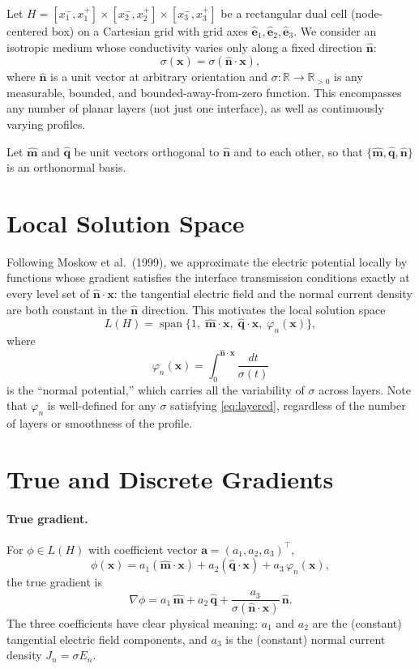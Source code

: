 \documentclass[11pt]{article}
\newcommand{\nn}{\hat{\bm{n}}}
\newcommand{\mm}{\hat{\bm{m}}}
\newcommand{\qq}{\hat{\bm{q}}}
\newcommand{\ee}[1]{\hat{\bm{e}}_{#1}}
\begin{document}
Let $H = [x_1^-,x_1^+]\times[x_2^-,x_2^+]\times[x_3^-,x_3^+]$ be a rectangular
dual cell (node-centered box) on a Cartesian grid with grid axes
$\ee{1},\ee{2},\ee{3}$.  We consider an isotropic medium whose conductivity
varies only along a fixed direction $\nn$:
\begin{equation}\label{eq:layered}
    \sigma(\bm{x}) = \sigma(\nn\cdot\bm{x}),
\end{equation}
where $\nn$ is a unit vector at arbitrary orientation and $\sigma:\mathbb{R}\to\mathbb{R}_{>0}$
is any measurable, bounded, and bounded-away-from-zero function.  This
encompasses any number of planar layers (not just one interface), as well as
continuously varying profiles.

Let $\mm$ and $\qq$ be unit vectors orthogonal to $\nn$ and to each other, so
that $\{\mm,\qq,\nn\}$ is an orthonormal basis.

\section{Local Solution Space}

Following Moskow et al.\ (1999), we approximate the electric potential locally
by functions whose gradient satisfies the interface transmission conditions
exactly at every level set of $\nn\cdot\bm{x}$: the tangential electric field
and the normal current density are both constant in the $\nn$ direction.
This motivates the local solution space
\[
    L(H) = \operatorname{span}\bigl\{1,\;\mm\cdot\bm{x},\;\qq\cdot\bm{x},\;\varphi_n(\bm{x})\bigr\},
\]
where
\[
    \varphi_n(\bm{x}) = \int_0^{\nn\cdot\bm{x}} \frac{dt}{\sigma(t)}
\]
is the ``normal potential,'' which carries all the variability of $\sigma$
across layers.  Note that $\varphi_n$ is well-defined for any $\sigma$
satisfying \eqref{eq:layered}, regardless of the number of layers or
smoothness of the profile.

\section{True and Discrete Gradients}

\paragraph{True gradient.}
For $\phi\in L(H)$ with coefficient vector $\bm{a}=(a_1,a_2,a_3)^\top$,
\[
    \phi(\bm{x}) = a_1(\mm\cdot\bm{x}) + a_2(\qq\cdot\bm{x}) + a_3\,\varphi_n(\bm{x}),
\]
the true gradient is
\begin{equation}\label{eq:true_grad}
    \nabla\phi = a_1\,\mm + a_2\,\qq + \frac{a_3}{\sigma(\nn\cdot\bm{x})}\,\nn.
\end{equation}
The three coefficients have clear physical meaning: $a_1$ and $a_2$ are the
(constant) tangential electric field components, and $a_3$ is the (constant)
normal current density $J_n = \sigma E_n$.
\end{document}

